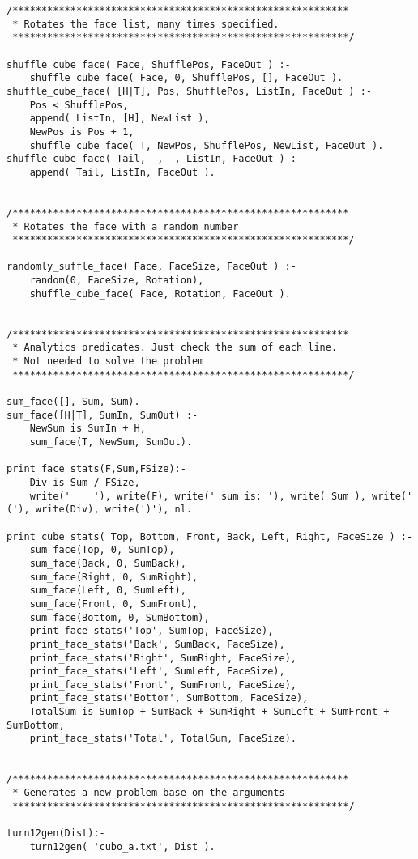 \begin{lstlisting}
/**********************************************************
 * Rotates the face list, many times specified.
 **********************************************************/
 
shuffle_cube_face( Face, ShufflePos, FaceOut ) :-
	shuffle_cube_face( Face, 0, ShufflePos, [], FaceOut ).
shuffle_cube_face( [H|T], Pos, ShufflePos, ListIn, FaceOut ) :-
	Pos < ShufflePos,
	append( ListIn, [H], NewList ),
	NewPos is Pos + 1,
	shuffle_cube_face( T, NewPos, ShufflePos, NewList, FaceOut ).
shuffle_cube_face( Tail, _, _, ListIn, FaceOut ) :-
	append( Tail, ListIn, FaceOut ).
	
	
/**********************************************************
 * Rotates the face with a random number
 **********************************************************/
 
randomly_suffle_face( Face, FaceSize, FaceOut ) :-
	random(0, FaceSize, Rotation),
	shuffle_cube_face( Face, Rotation, FaceOut ).
	
	
/**********************************************************
 * Analytics predicates. Just check the sum of each line.
 * Not needed to solve the problem
 **********************************************************/
 
sum_face([], Sum, Sum).
sum_face([H|T], SumIn, SumOut) :-
	NewSum is SumIn + H,
	sum_face(T, NewSum, SumOut).
	
print_face_stats(F,Sum,FSize):-
	Div is Sum / FSize,
	write('    '), write(F), write(' sum is: '), write( Sum ), write(' ('), write(Div), write(')'), nl.
	
print_cube_stats( Top, Bottom, Front, Back, Left, Right, FaceSize ) :-
	sum_face(Top, 0, SumTop),
	sum_face(Back, 0, SumBack),
	sum_face(Right, 0, SumRight),
	sum_face(Left, 0, SumLeft),
	sum_face(Front, 0, SumFront),
	sum_face(Bottom, 0, SumBottom),
	print_face_stats('Top', SumTop, FaceSize),
	print_face_stats('Back', SumBack, FaceSize),
	print_face_stats('Right', SumRight, FaceSize),
	print_face_stats('Left', SumLeft, FaceSize),
	print_face_stats('Front', SumFront, FaceSize),
	print_face_stats('Bottom', SumBottom, FaceSize),
	TotalSum is SumTop + SumBack + SumRight + SumLeft + SumFront + SumBottom,
	print_face_stats('Total', TotalSum, FaceSize).
	
	
/**********************************************************
 * Generates a new problem base on the arguments
 **********************************************************/

turn12gen(Dist):-
	turn12gen( 'cubo_a.txt', Dist ).


\end{lstlisting}
